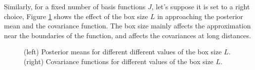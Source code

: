 \documentclass[]{interact}
\theoremstyle{plain}%
\theoremstyle{definition}
\theoremstyle{remark}
\begin{document}
Similarly, for a fixed number of basis functions $J$, let's suppose it is set to a right choice, Figure \ref{fig2_Post_L} shows the effect of the box size $L$ in approaching the posterior mean and the covariance function. The box size mainly affects the approximation near the boundaries of the function, and affects the covariances at long distances.

\begin{figure}[H]
\centering
{}
\caption{(left) Posterior means for different different values of the box size $L$. (right) Covariance functions for different values of the box size $L$.}
  \label{fig2_Post_L}
\end{figure}
\end{document}
